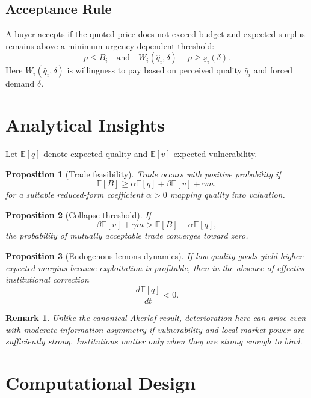 \documentclass[12pt]{article}
\newtheorem{proposition}{Proposition}
\newtheorem{remark}{Remark}
\begin{document}
\subsection{Acceptance Rule}

A buyer accepts if the quoted price does not exceed budget and expected surplus remains above a minimum urgency-dependent threshold:
\[
p \le B_i
\quad \text{and} \quad
W_i(\hat q_i,\delta) - p \ge \underline s_i(\delta).
\]
Here $W_i(\hat q_i,\delta)$ is willingness to pay based on perceived quality $\hat q_i$ and forced demand $\delta$.

\section{Analytical Insights}

Let $\mathbb E[q]$ denote expected quality and $\mathbb E[v]$ expected vulnerability.

\begin{proposition}[Trade feasibility]
Trade occurs with positive probability if
\[
\mathbb E[B] \ge \alpha \mathbb E[q] + \beta \mathbb E[v] + \gamma m,
\]
for a suitable reduced-form coefficient $\alpha > 0$ mapping quality into valuation.
\end{proposition}

\begin{proposition}[Collapse threshold]
If
\[
\beta \mathbb E[v] + \gamma m > \mathbb E[B] - \alpha \mathbb E[q],
\]
the probability of mutually acceptable trade converges toward zero.
\end{proposition}

\begin{proposition}[Endogenous lemons dynamics]
If low-quality goods yield higher expected margins because exploitation is profitable, then in the absence of effective institutional correction
\[
\frac{d \mathbb E[q]}{dt} < 0.
\]
\end{proposition}

\begin{remark}
Unlike the canonical Akerlof result, deterioration here can arise even with moderate information asymmetry if vulnerability and local market power are sufficiently strong. Institutions matter only when they are strong enough to bind.
\end{remark}

\section{Computational Design}
\end{document}
